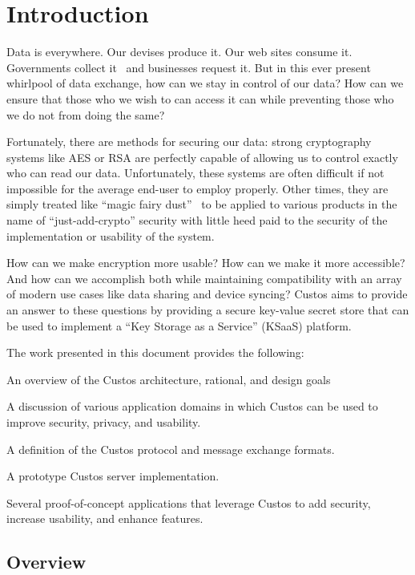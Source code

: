 \chapter{Introduction}
\label{chap:intro}

Data is everywhere. Our devises produce it. Our web sites consume
it. Governments collect it~\cite{GreenwaldPrism} and businesses
request it. But in this ever present whirlpool of data exchange, how
can we stay in control of our data? How can we ensure that those who
we wish to can access it can while preventing those who we do not from
doing the same?

Fortunately, there are methods for securing our data: strong
cryptography systems like AES or RSA are perfectly capable of allowing
us to control exactly who can read our data. Unfortunately, these
systems are often difficult if not impossible for the average end-user
to employ properly. Other times, they are simply treated like ``magic
fairy dust''~\cite{Smith2003, schneier2000secrets} to be applied to
various products in the name of ``just-add-crypto'' security with
little heed paid to the security of the implementation or usability of
the system.

How can we make encryption more usable? How can we make it more
accessible? And how can we accomplish both while maintaining
compatibility with an array of modern use cases like data sharing and
device syncing? Custos aims to provide an answer to these questions by
providing a secure key-value secret store that can be used to
implement a ``Key Storage as a Service'' (KSaaS) platform.

The work presented in this document provides the following:

\begin{packed_item}
\item An overview of the Custos architecture, rational, and design goals
\item A discussion of various application domains in which Custos can
  be used to improve security, privacy, and usability.
\item A definition of the Custos protocol and message exchange formats.
\item A prototype Custos server implementation.
\item Several proof-of-concept applications that leverage Custos to
  add security, increase usability, and enhance features.
\end{packed_item}

\section{Overview}

